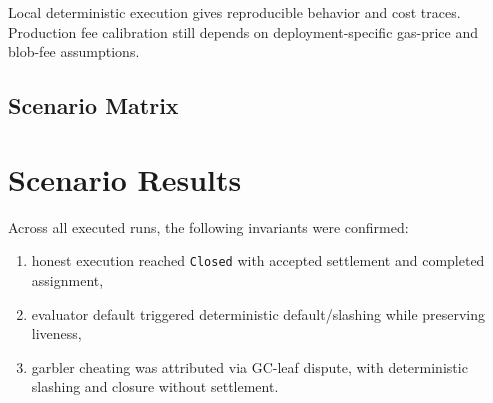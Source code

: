 \documentclass[final,twoside]{vutinfth}
\begin{document}
Local deterministic execution gives reproducible behavior and cost traces.
Production fee calibration still depends on deployment-specific gas-price and
blob-fee assumptions.

\subsection{Scenario Matrix}
\begin{table}[htbp]
\centering
{}
\caption{End-to-end evaluation scenarios used for protocol validation.}
\label{tab:evaluation-scenarios}
\end{table}

\section{Scenario Results}


Across all executed runs, the following invariants were confirmed:
\begin{enumerate}
\item honest execution reached \texttt{Closed} with accepted settlement and completed assignment,
\item evaluator default triggered deterministic default/slashing while preserving liveness,
\item garbler cheating was attributed via GC-leaf dispute, with deterministic slashing and closure without settlement.
\end{enumerate}
\end{document}
